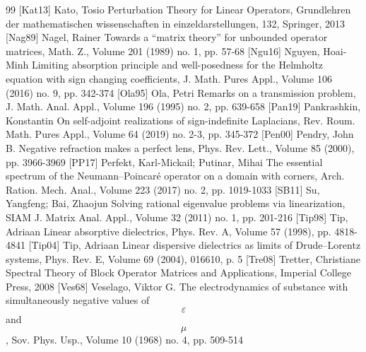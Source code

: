 \documentclass[10pt]{amsart}
\theoremstyle{definition}
\begin{document}
\begin{thebibliography}{99}
 [Kat13] Kato, Tosio Perturbation Theory for Linear Operators, Grundlehren der mathematischen wissenschaften in einzeldarstellungen, 132, Springer, 2013
 [Nag89] Nagel, Rainer Towards a “matrix theory” for unbounded operator matrices, Math. Z., Volume 201 (1989) no. 1, pp. 57-68
 [Ngu16] Nguyen, Hoai-Minh Limiting absorption principle and well-posedness for the Helmholtz equation with sign changing coefficients, J. Math. Pures Appl., Volume 106 (2016) no. 9, pp. 342-374
 [Ola95] Ola, Petri Remarks on a transmission problem, J. Math. Anal. Appl., Volume 196 (1995) no. 2, pp. 639-658
 [Pan19] Pankrashkin, Konstantin On self-adjoint realizations of sign-indefinite Laplacians, Rev. Roum. Math. Pures Appl., Volume 64 (2019) no. 2-3, pp. 345-372
 [Pen00] Pendry, John B. Negative refraction makes a perfect lens, Phys. Rev. Lett., Volume 85 (2000), pp. 3966-3969
 [PP17] Perfekt, Karl-Mickail; Putinar, Mihai The essential spectrum of the Neumann–Poincaré operator on a domain with corners, Arch. Ration. Mech. Anal., Volume 223 (2017) no. 2, pp. 1019-1033
 [SB11] Su, Yangfeng; Bai, Zhaojun Solving rational eigenvalue problems via linearization, SIAM J. Matrix Anal. Appl., Volume 32 (2011) no. 1, pp. 201-216
 [Tip98] Tip, Adriaan Linear absorptive dielectrics, Phys. Rev. A, Volume 57 (1998), pp. 4818-4841
 [Tip04] Tip, Adriaan Linear dispersive dielectrics as limits of Drude–Lorentz systems, Phys. Rev. E, Volume 69 (2004), 016610, p. 5
 [Tre08] Tretter, Christiane Spectral Theory of Block Operator Matrices and Applications, Imperial College Press, 2008
 [Ves68] Veselago, Viktor G. The electrodynamics of substance with simultaneously negative values of $$\varepsilon $$ and $$\mu $$, Sov. Phys. Usp., Volume 10 (1968) no. 4, pp. 509-514
\end{thebibliography}
\end{document}
